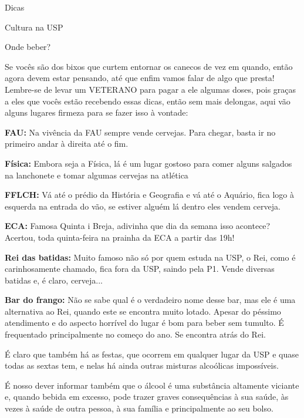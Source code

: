 \begin{secao}{Dicas}
\begin{subsecao}{Cultura na USP}
\end{subsecao}

\begin{subsecao}{Onde beber?}

Se vocês são dos bixos que curtem entornar os canecos de vez em quando, então
agora devem estar pensando, até que enfim vamos falar de algo que presta!
Lembre-se de levar um VETERANO para pagar a ele algumas doses, pois graças a
eles que vocês estão recebendo essas dicas, então sem mais delongas, aqui vão
alguns lugares firmeza para se fazer isso à vontade:

{\bf FAU:} Na vivência da FAU sempre vende cervejas. Para chegar, basta ir no primeiro andar à direita até o fim.

{\bf Física:} Embora seja a Física, lá é um lugar gostoso para comer alguns
salgados na lanchonete e tomar algumas cervejas na atlética

{\bf FFLCH:} Vá até o prédio da História e Geografia e vá até o Aquário, fica logo à esquerda na entrada do vão, se estiver alguém lá dentro eles vendem cerveja.

{\bf ECA:} Famosa Quinta i Breja, adivinha que dia da semana isso acontece?
Acertou, toda quinta-feira na prainha da ECA a partir das 19h!

{\bf Rei das batidas:} Muito famoso não só por quem estuda na USP, o Rei,
como é carinhosamente chamado, fica fora da USP, saindo pela P1. Vende
diversas batidas e, é claro, cerveja...

{\bf Bar do frango:} Não se sabe qual é o verdadeiro nome desse bar, mas ele é
uma alternativa ao Rei, quando este se encontra muito lotado. Apesar do péssimo atendimento e do aspecto horrível do lugar é bom para beber sem
tumulto. É frequentado principalmente no começo do ano. Se encontra atrás do
Rei.

É claro que também há as festas, que ocorrem em qualquer lugar da USP e quase todas as sextas tem, e nelas
há ainda outras misturas alcoólicas impossíveis.

É nosso dever informar também que o álcool é uma substância altamente viciante
e, quando bebida em excesso, pode trazer graves consequências à sua saúde, às
vezes à saúde de outra pessoa, à sua família e principalmente ao seu bolso.

\end{subsecao}
\end{secao}
